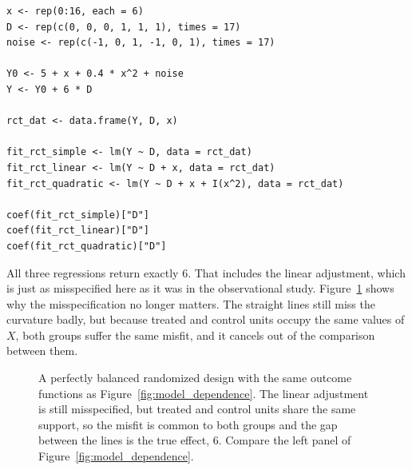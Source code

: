 \documentclass[11pt]{report}
\begin{document}
\begin{lstlisting}
x <- rep(0:16, each = 6)
D <- rep(c(0, 0, 0, 1, 1, 1), times = 17)
noise <- rep(c(-1, 0, 1, -1, 0, 1), times = 17)

Y0 <- 5 + x + 0.4 * x^2 + noise
Y <- Y0 + 6 * D

rct_dat <- data.frame(Y, D, x)

fit_rct_simple <- lm(Y ~ D, data = rct_dat)
fit_rct_linear <- lm(Y ~ D + x, data = rct_dat)
fit_rct_quadratic <- lm(Y ~ D + x + I(x^2), data = rct_dat)

coef(fit_rct_simple)["D"]
coef(fit_rct_linear)["D"]
coef(fit_rct_quadratic)["D"]
\end{lstlisting}

All three regressions return exactly 6. That includes the linear adjustment, which is just as misspecified here as it was in the observational study. Figure~\ref{fig:rct_balance} shows why the misspecification no longer matters. The straight lines still miss the curvature badly, but because treated and control units occupy the same values of \(X\), both groups suffer the same misfit, and it cancels out of the comparison between them.

\begin{figure}[H]
\centering
{}
\caption{A perfectly balanced randomized design with the same outcome functions as Figure~\ref{fig:model_dependence}. The linear adjustment is still misspecified, but treated and control units share the same support, so the misfit is common to both groups and the gap between the lines is the true effect, 6. Compare the left panel of Figure~\ref{fig:model_dependence}.}
\label{fig:rct_balance}
\end{figure}
\end{document}
